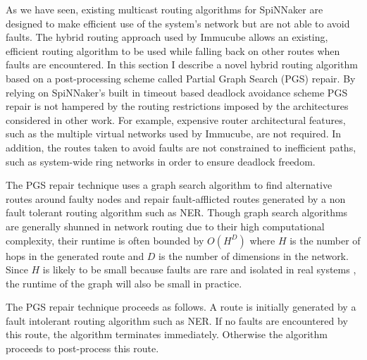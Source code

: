 		As we have seen, existing multicast routing algorithms for SpiNNaker are
		designed to make efficient use of the system's network but are not able to
		avoid faults. The hybrid routing approach used by Immucube allows an
		existing, efficient routing algorithm to be used while falling back on
		other routes when faults are encountered.  In this section I describe a
		novel hybrid routing algorithm based on a post-processing scheme called
		Partial Graph Search (PGS) repair.  By relying on SpiNNaker's built in
		timeout based deadlock avoidance scheme PGS repair is not hampered by the
		routing restrictions imposed by the architectures considered in other work.
		For example, expensive router architectural features, such as the multiple
		virtual networks used by Immucube, are not required. In addition, the
		routes taken to avoid faults are not constrained to inefficient paths, such
		as system-wide ring networks in order to ensure deadlock freedom.
		
		The PGS repair technique uses a graph search algorithm to find alternative
		routes around faulty nodes and repair fault-afflicted routes generated by a
		non fault tolerant routing algorithm such as NER. Though graph search
		algorithms are generally shunned in network routing due to their high
		computational complexity, their runtime is often bounded by $O(H^D)$ where
		$H$ is the number of hops in the generated route and $D$ is the number of
		dimensions in the network.  Since $H$ is likely to be small because faults
		are rare and isolated in real systems \cite{gara05,alverson12}, the runtime
		of the graph will also be small in practice.
		
		The PGS repair technique proceeds as follows. A route is initially
		generated by a fault intolerant routing algorithm such as NER. If no faults
		are encountered by this route, the algorithm terminates immediately.
		Otherwise the algorithm proceeds to post-process this route.
		
